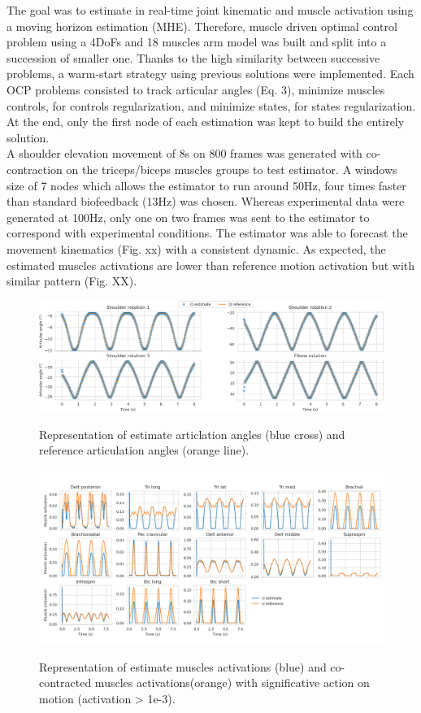 \documentclass[10pt,a4paper]{article}
\begin{document}
The goal was to estimate in real-time joint kinematic and muscle activation using a moving horizon estimation (MHE). Therefore, muscle driven optimal control problem using a 4DoFs and 18 muscles arm model was built and split into a succession of smaller one. Thanks to the high similarity between successive problems, a warm-start strategy using previous solutions were implemented. Each OCP problems consisted to track articular angles (Eq. 3), minimize muscles controls, for controls regularization, and minimize states, for states regularization. At the end, only the first node of each estimation was kept to build the entirely solution.\\ A shoulder elevation movement of 8s on 800 frames was generated with co-contraction on the triceps/biceps muscles groups to test estimator. A windows size of 7 nodes which allows the estimator to run around 50Hz, four times faster than standard biofeedback (13Hz) was chosen. Whereas experimental data were generated at 100Hz, only one on two frames was sent to the estimator to correspond with experimental conditions. The estimator was able to forecast the movement kinematics (Fig. xx) with a consistent dynamic. As expected, the estimated muscles activations are lower than reference motion activation but with similar pattern (Fig. XX). 

\begin{figure}[t!]
\centering
\includegraphics[width=\textwidth]{figures/Articular_angle_MHE.png}\\
\caption{Representation of estimate articlation angles (blue cross) and reference articulation angles (orange line).}
\label{fig:angulare_angle_MHE}
\end{figure}
\begin{figure}[t!]
\centering
\includegraphics[width=\textwidth]{figures/Muscles_excitations_MHE.png}\\
\caption{Representation of estimate muscles activations (blue) and co-contracted muscles activations(orange) with significative action on motion (activation > 1e-3).}
\label{fig:muscles_excitations_MHE}
\end{figure}
\end{document}
